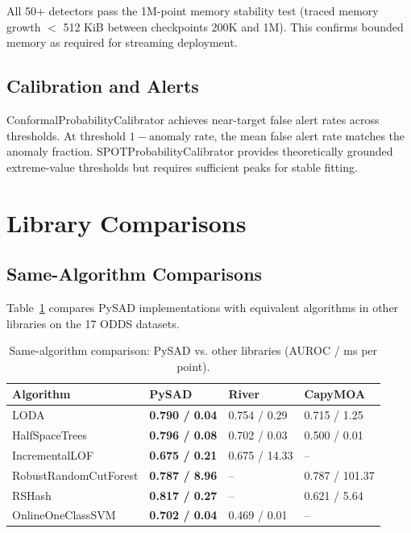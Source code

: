 \documentclass[11pt,a4paper]{article}
\begin{document}
All 50+ detectors pass the 1M-point memory stability test (traced memory growth $<$ 512 KiB between checkpoints 200K and 1M). This confirms bounded memory as required for streaming deployment.

\subsection{Calibration and Alerts}
\label{sec:results_calibration}

ConformalProbabilityCalibrator achieves near-target false alert rates across thresholds. At threshold $1-\text{anomaly rate}$, the mean false alert rate matches the anomaly fraction. SPOTProbabilityCalibrator provides theoretically grounded extreme-value thresholds but requires sufficient peaks for stable fitting.

\section{Library Comparisons}
\label{sec:comparisons}

\subsection{Same-Algorithm Comparisons}
\label{sec:same_algo}

Table~\ref{tab:comparison_summary} compares PySAD implementations with equivalent algorithms in other libraries on the 17 ODDS datasets.

\begin{table}[htbp]
\centering
\caption{Same-algorithm comparison: PySAD vs. other libraries (AUROC / ms per point).}
\label{tab:comparison_summary}
\begin{tabular}{llll}
\toprule
Algorithm & PySAD & River & CapyMOA \\
\midrule
LODA & \textbf{0.790 / 0.04} & 0.754 / 0.29 & 0.715 / 1.25 \\
HalfSpaceTrees & \textbf{0.796 / 0.08} & 0.702 / 0.03 & 0.500 / 0.01 \\
IncrementalLOF & \textbf{0.675 / 0.21} & 0.675 / 14.33 & -- \\
RobustRandomCutForest & \textbf{0.787 / 8.96} & -- & 0.787 / 101.37 \\
RSHash & \textbf{0.817 / 0.27} & -- & 0.621 / 5.64 \\
OnlineOneClassSVM & \textbf{0.702 / 0.04} & 0.469 / 0.01 & -- \\
\bottomrule
\end{tabular}
\end{table}
\end{document}
